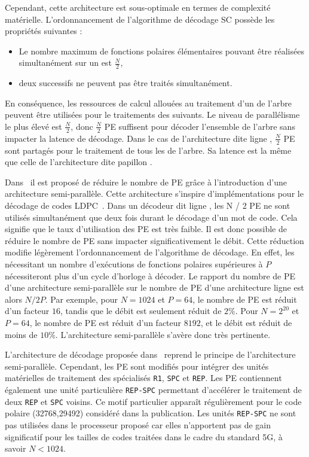 Cependant, cette architecture est sous-optimale en termes de complexité matérielle.
L'ordonnancement de l'algorithme de décodage SC possède les propriétés suivantes :
\begin{itemize}
  \item Le nombre maximum de fonctions polaires élémentaires pouvant être réalisées simultanément sur un \noeud est $\frac{N}{2}$,
  \item deux \noeuds successifs ne peuvent pas être traités simultanément.
\end{itemize}
En conséquence, les ressources de calcul allouées au traitement d'un \noeud de l'arbre peuvent être utilisées pour le traitements des \noeuds suivants.
Le niveau de parallélisme le plus élevé est $\frac{N}{2}$, donc $\frac{N}{2}$ PE suffisent pour décoder l'ensemble de l'arbre sans impacter la latence de décodage.
Dans le cas de l'architecture dite \og ligne \fg, $\frac{N}{2}$ PE sont partagés pour le traitement de tous les \noeuds de l'arbre. Sa latence est la même que celle de l'architecture dite \og papillon \fg.

Dans~\cite{leroux_semi-parallel_2013} il est proposé de réduire le nombre de PE grâce à l'introduction d'une architecture semi-parallèle. Cette architecture s'inspire d'implémentations pour le décodage de codes LDPC~\cite{1049697}. Dans un décodeur dit \og ligne \fg, les N / 2 PE ne sont utilisés simultanément que deux fois durant le décodage d'un mot de code. Cela signifie que le taux d'utilisation des PE est très faible. Il est donc possible de réduire le nombre de PE sans impacter significativement le débit.
Cette réduction modifie légèrement l'ordonnancement de l'algorithme de décodage. En effet, les \noeuds nécessitant un nombre d'exécutions de fonctions polaires supérieures à $P$ nécessiteront plus d'un cycle d'horloge à décoder. Le rapport du nombre de PE d'une architecture semi-parallèle sur le nombre de PE d'une architecture \og ligne \fg est alors $N/2P$. Par exemple, pour $N=1024$ et $P=64$, le nombre de PE est réduit d'un facteur $16$, tandis que le débit est seulement réduit de $2\%$. Pour $N=2^{20}$ et $P=64$, le nombre de PE est réduit d'un facteur $8192$, et le débit est réduit de moins de $10\%$. L'architecture semi-parallèle s'avère donc très pertinente.

L'architecture de décodage proposée dans~\cite{sarkis_fast_2014} reprend le principe de l'architecture semi-parallèle. Cependant, les PE sont modifiés pour intégrer des unités matérielles de traitement des \noeuds spécialisés \texttt{R1}, \texttt{SPC} et \texttt{REP}. Les PE contiennent également une unité particulière \texttt{REP-SPC} permettant d’accélérer le traitement de deux \noeuds \texttt{REP} et \texttt{SPC} voisins. Ce motif particulier apparaît régulièrement pour le code polaire (32768,29492) considéré dans la publication. Les unités \texttt{REP-SPC} ne sont pas utilisées dans le processeur proposé car elles n'apportent pas de gain significatif pour les tailles de codes traitées dans le cadre du standard 5G, à savoir $N<1024$.


